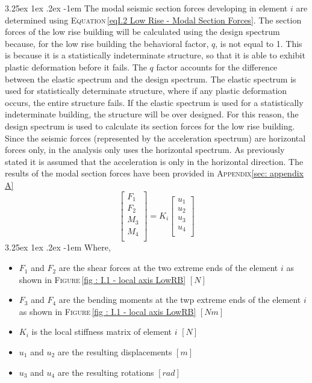 \documentclass[11pt,a4paper,titlepage]{report}
\makeatletter
\renewcommand\paragraph{\@startsection{paragraph}{5}{\z@}%
  {3.25ex \@plus1ex \@minus.2ex}%
  {-1em}%
  {\normalfont\normalsize\bfseries}}
\makeatother
\begin{document}
\paragraph{}The modal seismic section forces developing in element $i$ are determined using \textsc{Equation}\,\eqref{eqI.2 Low Rise - Modal Section Forces}. The section forces of the low rise building will be calculated using the design spectrum because, for the low rise building the behavioral factor, $q$, is not equal to 1. This is because it is a statistically indeterminate structure, so that it is able to exhibit plastic deformation before it fails. The $q$ factor accounts for the difference between the elastic spectrum and the design spectrum. The elastic spectrum is used for statistically determinate structure, where if any plastic deformation occurs, the entire structure fails. If the elastic spectrum is used for a statistically indeterminate building, the structure will be over designed. For this reason, the design spectrum is used to calculate its section forces for the low rise building. Since the seismic forces (represented by the acceleration spectrum) are horizontal forces only, in the analysis only uses the horizontal spectrum. As previously stated it is assumed that the acceleration is only in the horizontal direction. The results of the modal section forces have been provided in \textsc{Appendix}\ref{sec: appendix A}
\begin{equation}
   \left[
   \begin{matrix}
   F_1\\
   F_2\\
   M_3\\
   M_4\\
   \end{matrix}
   \right] = K_i
     \left[
   \begin{matrix}
   u_1\\
   u_2\\
   u_3\\
   u_4\\
   \end{matrix}
   \right]
   \label{eqI.2 Low Rise - Modal Section Forces}
\end{equation}
\paragraph{}Where,
\begin{itemize}
    \item $F_1$ and $F_2$ are the shear forces at the two extreme ends of the element $i$ as shown in \textsc{Figure}\,\ref{fig : I.1 - local axis LowRB} $[N]$
    \item $F_3$ and $F_4$ are the bending moments at the twp extreme ends of the element $i$ as shown in \textsc{Figure}\,\ref{fig : I.1 - local axis LowRB} $[Nm]$
    \item $K_i$ is the local stiffness matrix of element $i$ $[N]$
    \item $u_1$ and $u_2$ are the resulting displacements $[m]$
    \item $u_3$ and $u_4$ are the resulting rotations $[rad]$
\end{itemize}
\end{document}
